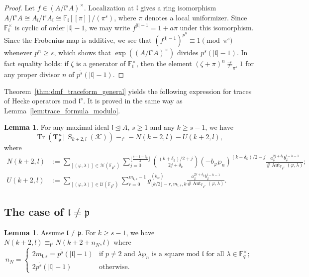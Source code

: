 \documentclass[10pt]{article}
\theoremstyle{definition}
\newtheorem{lemma}[theorem]{Lemma}
\let\phi\varphi
\DeclareMathOperator\Aut{Aut}
\DeclareMathOperator\Tr{Tr}
\renewcommand{\:}{\colon}
\newcommand{\T}{\mathbf{T}}
\renewcommand{\S}{\operatorname{S}}
\newcommand{\bF}{\mathbb{F}}
\renewcommand{\l}{\mathfrak{l}}
\begin{document}
\begin{proof}
    Let $f \in (A/\l^sA)^\times$. Localization at $\l$ gives a ring isomorphism $A/\l^sA \cong A_{\l}/\l^sA_{\l} \cong \mathbb F_{\l}[\![\pi]\!]/(\pi^s)$, where $\pi$ denotes a local uniformizer.
    Since $\bF_{\l}^\times$ is cyclic of order $|\l|-1$, we may write $f^{|\l|-1} = 1 + a\pi$ under this isomorphism. Since the Frobenius map is additive, we see that $(f^{|\l|-1})^{p^n} \equiv 1 \pmod{\pi^s}$ whenever $p^n \geq s$, which shows that $\exp((A/\l^sA)^\times)$ divides $p^{\tilde{s}}(|\l|-1)$. In fact equality holds: if $\zeta$ is a generator of $\bF_{\l}^\times$, then the element $(\zeta + \pi)^n \not \equiv_{\pi^s} 1$ for any proper divisor $n$ of $p^{\tilde{s}}(|\l|-1)$. 
\end{proof}

 Theorem~\ref{thm:dmf_traceform_general} yields the following expression for traces of Hecke operators mod $\l^s$. It is proved
 in the same way as Lemma~\ref{lem:trace_formula_modulo}.

\begin{lemma}\label{lem:trace_formula_modulo_ff}
For any maximal ideal $\l \trianglelefteq A$, $s \geq 1$ and any $k \geq s-1$, we have
\[
\Tr(\T_{\mathfrak p}^n \, | \, \S_{k+2,l}({\mathcal K})) \equiv_{\l^s} -N(k+2,l) - U(k+2,l),
\]
where
\begin{align*} 
N(k+2,l) &:= \sum_{[(\phi,\lambda)] \in \mathcal N(\bF_{\mathfrak p^n})} \sum_{j=0}^{\lfloor \frac{s-1-\delta_k}{2} \rfloor} \binom{(k+\delta_k)/2+j}{2j+\delta_k} (-b_{\phi}\wp_n)^{(k-\delta_k)/2-j} \frac{a_{\phi}^{2j+\delta_k}b_{\phi}^{l-k-1}}{\#\Aut_{\mathbb F_{\mathfrak p^n}}(\phi,\lambda)};\\
    U(k+2,l) &:= \sum_{[(\phi,\lambda)] \in \mathcal U(\bF_{\mathfrak p^n})} \sum_{r=0}^{m_{\l,s}-1} g^{(b_{\phi})}_{\lfloor k/2\rfloor - r,m_{\l,s},k} \frac{a_{\phi}^{2r+\delta_k} b_{\phi}^{l-k-1}}{\#\Aut_{\mathbb F_{\mathfrak p^n}}(\phi,\lambda)}.
\end{align*}
\end{lemma}

\subsection{The case of $\l \neq \mathfrak{p}$}


\begin{lemma}
    Assume $\mathfrak l \neq \mathfrak p$. For $k \geq s-1$, we have $N(k+2,l) \equiv_{\l^s} N(k+2+n_N,l)$ where
    \[
    n_N = \begin{cases}
        2m_{\mathfrak l,s} = p^{\tilde{s}}(|\l|-1) & \text{if } p \neq 2 \text{ and } \lambda \wp_n \text{ is a square mod }\l \text{ for all } \lambda \in \mathbb F_q^\times;\\
        2p^{\tilde{s}}(|\l|-1) & \text{otherwise.}
    \end{cases}
    \] 
\end{lemma}
\end{document}

